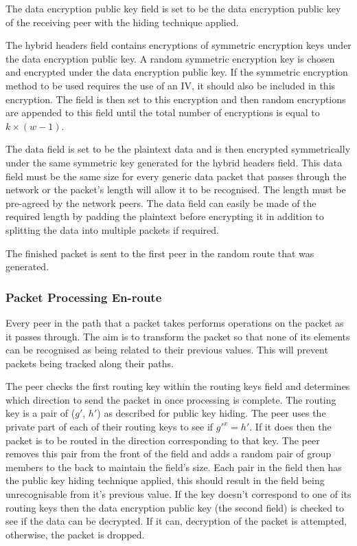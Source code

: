 \documentclass[ %
                    author={Luke Murray},
                supervisor={Dr. Simon Hollis},
                     title={Shadow Peer-to-Peer Networks},
                  subtitle={},
                    degree={MEng},
                      year={2013} ]{thesis}
\begin{document}
The data encryption public key field is set to be the data encryption public key of the receiving peer with the hiding technique applied.

The hybrid headers field contains encryptions of symmetric encryption keys under the data encryption public key. A random symmetric encryption key is chosen and encrypted under the data encryption public key. If the symmetric encryption method to be used requires the use of an IV, it should also be included in this encryption. The field is then set to this encryption and then random encryptions are appended to this field until the total number of encryptions is equal to $k \times (w - 1)$.

The data field is set to be the plaintext data and is then encrypted symmetrically under the same symmetric key generated for the hybrid headers field. This data field must be the same size for every generic data packet that passes through the network or the packet's length will allow it to be recognised. The length must be pre-agreed by the network peers. The data field can easily be made of the required length by padding the plaintext before encrypting it in addition to splitting the data into multiple packets if required.

The finished packet is sent to the first peer in the random route that was generated.

\subsubsection{Packet Processing En-route}

Every peer in the path that a packet takes performs operations on the packet as it passes through. The aim is to transform the packet so that none of its elements can be recognised as being related to their previous values. This will prevent packets being tracked along their paths.

The peer checks the first routing key within the routing keys field and determines which direction to send the packet in once processing is complete. The routing key is a pair of ($g\prime$, $h\prime$) as described for public key hiding. The peer uses the private part of each of their routing keys to see if $g\prime^{x} = h\prime$. If it does then the packet is to be routed in the direction corresponding to that key. The peer removes this pair from the front of the field and adds a random pair of group members to the back to maintain the field's size. Each pair in the field then has the public key hiding technique applied, this should result in the field being unrecognisable from it's previous value. If the key doesn't correspond to one of its routing keys then the data encryption public key (the second field) is checked to see if the data can be decrypted. If it can, decryption of the packet is attempted, otherwise, the packet is dropped.
\end{document}

